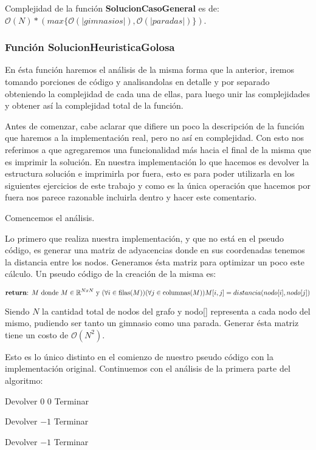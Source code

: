 Complejidad de la función \textbf{SolucionCasoGeneral} es de: $\mathcal{O}(N) * (max\{\mathcal{O}(|gimnasios|), \mathcal{O}(|paradas|)\})$.


\subsubsection{Función SolucionHeuristicaGolosa}


En ésta función haremos el análisis de la misma forma que la anterior, iremos tomando porciones de código y analisandolas en detalle y por separado obteniendo la complejidad de cada una de ellas, para luego unir las complejidades y obtener así la complejidad total de la función.

Antes de comenzar, cabe aclarar que difiere un poco la descripción de la función que haremos a la implementación real, pero no así en complejidad. Con esto nos referimos a que agregaremos una funcionalidad más hacia el final de la misma que es imprimir la solución. En nuestra implementación lo que hacemos es devolver la estructura solución e imprimirla por fuera, esto es para poder utilizarla en los siguientes ejercicios de este trabajo y como es la única operación que hacemos por fuera nos parece razonable incluirla dentro y hacer este comentario.

Comencemos el análisis.

Lo primero que realiza nuestra implementación, y que no está en el pseudo código, es generar una matriz de adyacencias donde en sus coordenadas tenemos la distancia entre los nodos. Generamos ésta matriz para optimizar un poco este cálculo. Un pseudo código de la creación de la misma es:

\[
	\text{\textbf{return}:  } M \text{ donde } M \in \mathbb{R}^{NxN} \text{ y } (\forall i \in \text{filas($M$)})(\forall j \in \text{columnas($M$)}) M[i,j] = distancia(nodo[i], nodo[j])
\]

Siendo $N$ la cantidad total de nodos del grafo y nodo[] representa a cada nodo del mismo, pudiendo ser tanto un gimnasio como una parada. Generar ésta matriz tiene un costo de $\mathcal{O}(N^2)$.

Esto es lo único distinto en el comienzo de nuestro pseudo código con la implementación original. Continuemos con el análisis de la primera parte del algoritmo:

\begin{algorithm}[H]
\label{}
\begin{algorithmic}[]

	\State Devolver $0$ $0$
	\State Terminar
\EndIf

	\State Devolver $-1$
	\State Terminar
\EndIf

	\State Devolver $-1$
	\State Terminar
\EndIf

\medskip
\Statex \underline{}
\end{algorithmic}
\end{algorithm}

